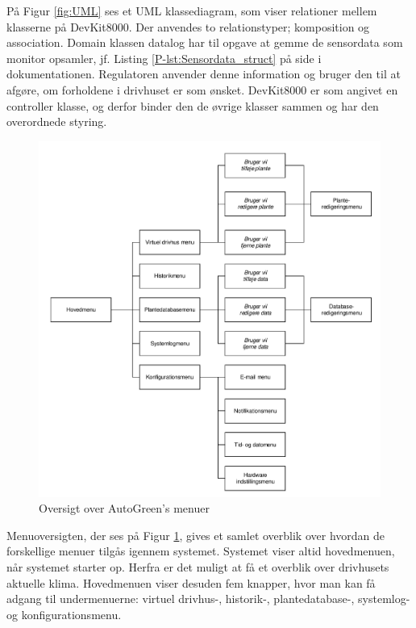 På Figur \ref{fig:UML} ses et UML klassediagram, som viser relationer mellem klasserne på DevKit8000. Der anvendes to relationstyper; komposition og association. Domain klassen datalog har til opgave at gemme de sensordata som monitor opsamler, jf. Listing \ref{P-lst:Sensordata_struct} på side \pageref{P-lst:Sensordata_struct} i dokumentationen. Regulatoren anvender denne information og bruger den til at afgøre, om forholdene i drivhuset er som ønsket. DevKit8000 er som angivet en controller klasse, og derfor binder den de øvrige klasser sammen og har den overordnede styring.

\clearpage

\begin{figure}[h]
\centering 
\includegraphics[width=\textwidth] {../fig/menu_oversigt.pdf}
\caption{Oversigt over AutoGreen's menuer}
\label{fig:QTMenu}
\end{figure}

Menuoversigten, der ses på Figur \ref{fig:QTMenu}, gives et samlet overblik over hvordan de forskellige menuer tilgås igennem systemet. Systemet viser altid hovedmenuen, når systemet starter op. Herfra er det muligt at få et overblik over drivhusets aktuelle klima. Hovedmenuen viser desuden fem knapper, hvor man kan få adgang til undermenuerne: virtuel drivhus-, historik-, plantedatabase-, systemlog- og konfigurationsmenu.

\clearpage